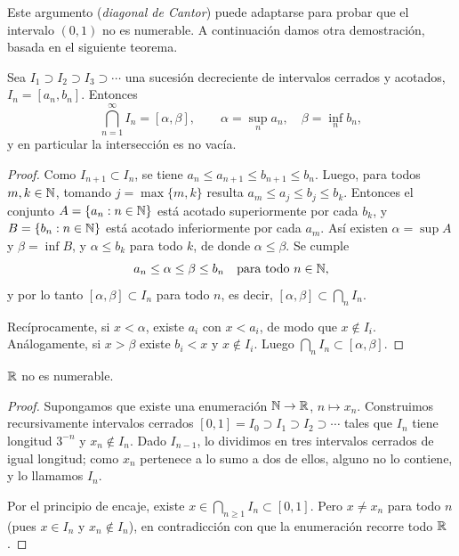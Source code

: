 Este argumento (\emph{diagonal de Cantor}) puede adaptarse para probar que el intervalo \((0, 1)\) no es numerable. A continuación damos otra demostración, basada en el siguiente teorema.

\begin{theorem}
  Sea \(I_1 \supset I_2 \supset I_3 \supset \cdots\) una sucesión decreciente de intervalos cerrados y acotados, \(I_n = [a_n, b_n]\). Entonces
  \[
    \bigcap_{n=1}^{\infty} I_n = [\alpha, \beta], \qquad \alpha = \sup_n a_n, \quad \beta = \inf_n b_n,
  \]
  y en particular la intersección es no vacía.
\end{theorem}

\begin{proof}
  Como \(I_{n+1} \subset I_n\), se tiene \(a_n \leq a_{n+1} \leq b_{n+1} \leq b_n\). Luego, para todos \(m, k \in \mathbb{N}\), tomando \(j = \max\{m, k\}\) resulta \(a_m \leq a_j \leq b_j \leq b_k\). Entonces el conjunto \(A = \{ a_n : n \in \mathbb{N} \}\) está acotado superiormente por cada \(b_k\), y \(B = \{ b_n : n \in \mathbb{N} \}\) está acotado inferiormente por cada \(a_m\). Así existen \(\alpha = \sup A\) y \(\beta = \inf B\), y \(\alpha \leq b_k\) para todo \(k\), de donde \(\alpha \leq \beta\). Se cumple
  \[
    a_n \leq \alpha \leq \beta \leq b_n \quad \text{para todo } n \in \mathbb{N},
  \]
  y por lo tanto \([\alpha, \beta] \subset I_n\) para todo \(n\), es decir, \([\alpha, \beta] \subset \bigcap_n I_n\).

  Recíprocamente, si \(x < \alpha\), existe \(a_i\) con \(x < a_i\), de modo que \(x \notin I_i\). Análogamente, si \(x > \beta\) existe \(b_i < x\) y \(x \notin I_i\). Luego \(\bigcap_n I_n \subset [\alpha, \beta]\).
\end{proof}

\begin{theorem}
  \(\mathbb{R}\) no es numerable.
\end{theorem}

\begin{proof}
  Supongamos que existe una enumeración \(\mathbb{N} \to \mathbb{R}\), \(n \mapsto x_n\). Construimos recursivamente intervalos cerrados \([0, 1] = I_0 \supset I_1 \supset I_2 \supset \cdots\) tales que \(I_n\) tiene longitud \(3^{-n}\) y \(x_n \notin I_n\). Dado \(I_{n-1}\), lo dividimos en tres intervalos cerrados de igual longitud; como \(x_n\) pertenece a lo sumo a dos de ellos, alguno no lo contiene, y lo llamamos \(I_n\).

  Por el principio de encaje, existe \(x \in \bigcap_{n \geq 1} I_n \subset [0, 1]\). Pero \(x \neq x_n\) para todo \(n\) (pues \(x \in I_n\) y \(x_n \notin I_n\)), en contradicción con que la enumeración recorre todo \(\mathbb{R}\).
\end{proof}

